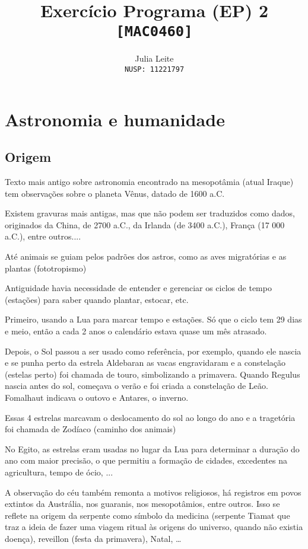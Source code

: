 \documentclass{article}
\title{Exercício Programa (EP) 2\\
    \large \texttt{[MAC0460]}}
\author{Julia Leite\\
    \large \texttt{NUSP: 11221797}}
\begin{document}
    
\maketitle

\tableofcontents

\newpage

\section{Astronomia e humanidade}

\subsection{Origem}

Texto mais antigo sobre astronomia encontrado na mesopotâmia (atual
Iraque) tem observações sobre o planeta Vênus, datado de 1600 a.C.

Existem gravuras mais antigas, mas que não podem ser traduzidos como 
dados, originados da China, de 2700 a.C., da Irlanda (de 3400 a.C.),
França (17 000 a.C.), entre outros....

Até animais se guiam pelos padrões dos astros, como as aves migratórias
e as plantas (fototropismo)

Antiguidade havia necessidade de entender e gerenciar os ciclos de 
tempo (estações) para saber quando plantar, estocar, etc.

Primeiro, usando a Lua para marcar tempo e estações. Só que o ciclo 
tem 29 dias e meio, então a cada 2 anos o calendário estava quase um mês
atrasado.

Depois, o Sol passou a ser usado como referência, por exemplo, quando 
ele nascia e se punha perto da estrela Aldebaran as vacas engravidaram
e a constelação (estelas perto) foi chamada de touro, simbolizando a 
primavera. Quando Regulus nascia antes do sol, começava o verão e 
foi criada a constelação de Leão. Fomalhaut indicava o outovo e Antares, o inverno. 

Essas 4 estrelas marcavam o deslocamento do sol ao longo do ano e a 
tragetória foi chamada de Zodíaco (caminho dos animais)

No Egito, as estrelas eram usadas no lugar da Lua para determinar a 
duração do ano com maior precisão, o que permitiu a formação de cidades,
excedentes na agricultura, tempo de ócio, ... 

A observação do céu também remonta a motivos religiosos, há registros 
em povos extintos da Austrália, nos guaranis, nos mesopotâmios, entre 
outros. Isso se reflete na origem da serpente como símbolo da medicina
(serpente Tiamat que traz a ideia de fazer uma viagem ritual às origens
do universo, quando não existia doença), reveillon (festa da primavera),
Natal, \dots
\end{document}
